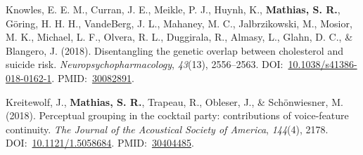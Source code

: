\documentclass[10pt]{article}
\makeatletter
\newlength{\bibhang}
\newlength{\bibsep}
 {\@listi \global\bibsep\itemsep \global\advance\bibsep by\parsep}
\newenvironment{bibsection}%
        {\vspace{-\baselineskip}\begin{list}{}{%
       \setlength{\leftmargin}{\bibhang}%
       \setlength{\itemindent}{-\leftmargin}%
       \setlength{\itemsep}{\bibsep}%
       \setlength{\parsep}{\z@}%
        \setlength{\partopsep}{0pt}%
        \setlength{\topsep}{0pt}}}
        {\end{list}\vspace{-.6\baselineskip}}
\makeatother
\begin{document}
\begin{bibsection}
\item Knowles, E. E. M., Curran, J. E., Meikle, P. J., Huynh, K., \textbf{Mathias, S. R.}, Göring, H. H. H., VandeBerg, J. L., Mahaney, M. C., Jalbrzikowski, M., Mosior, M. K., Michael, L. F., Olvera, R. L., Duggirala, R., Almasy, L., Glahn, D. C., \& Blangero, J. (2018). Disentangling the genetic overlap between cholesterol and suicide risk. \emph{Neuropsychopharmacology}, \emph{43}(13), 2556--2563. DOI:~\href{https://doi.org/10.1038/s41386-018-0162-1}{10.1038/s41386-018-0162-1}. PMID:~\href{https://www.ncbi.nlm.nih.gov/pubmed/?term=30082891}{30082891}.
\item Kreitewolf, J., \textbf{Mathias, S. R.}, Trapeau, R., Obleser, J., \& Schönwiesner, M. (2018). Perceptual grouping in the cocktail party: contributions of voice-feature continuity. \emph{The Journal of the Acoustical Society of America}, \emph{144}(4), 2178. DOI:~\href{https://doi.org/10.1121/1.5058684}{10.1121/1.5058684}. PMID:~\href{https://www.ncbi.nlm.nih.gov/pubmed/?term=30404485}{30404485}.

\end{bibsection}
\end{document}
